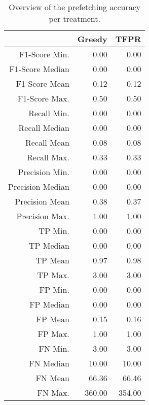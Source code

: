 \begin{table}[ht]
\centering
\begin{tabular}{rrr}
  \hline
 & Greedy & TFPR \\ 
  \hline
F1-Score Min. & 0.00 & 0.00 \\ 
  F1-Score Median & 0.00 & 0.00 \\ 
  F1-Score Mean & 0.12 & 0.12 \\ 
  F1-Score Max. & 0.50 & 0.50 \\ 
  Recall Min. & 0.00 & 0.00 \\ 
  Recall Median & 0.00 & 0.00 \\ 
  Recall Mean & 0.08 & 0.08 \\ 
  Recall Max. & 0.33 & 0.33 \\ 
  Precision Min. & 0.00 & 0.00 \\ 
  Precision Median & 0.00 & 0.00 \\ 
  Precision Mean & 0.38 & 0.37 \\ 
  Precision Max. & 1.00 & 1.00 \\ 
  TP Min. & 0.00 & 0.00 \\ 
  TP Median & 0.00 & 0.00 \\ 
  TP Mean & 0.97 & 0.98 \\ 
  TP Max. & 3.00 & 3.00 \\ 
  FP Min. & 0.00 & 0.00 \\ 
  FP Median & 0.00 & 0.00 \\ 
  FP Mean & 0.15 & 0.16 \\ 
  FP Max. & 1.00 & 1.00 \\ 
  FN Min. & 3.00 & 3.00 \\ 
  FN Median & 10.00 & 10.00 \\ 
  FN Mean & 66.36 & 66.46 \\ 
  FN Max. & 360.00 & 354.00 \\ 
   \hline
\end{tabular}
\caption{Overview of the prefetching accuracy per treatment.} 
\label{tab:results:rq3:summary:treatment}
\end{table}
